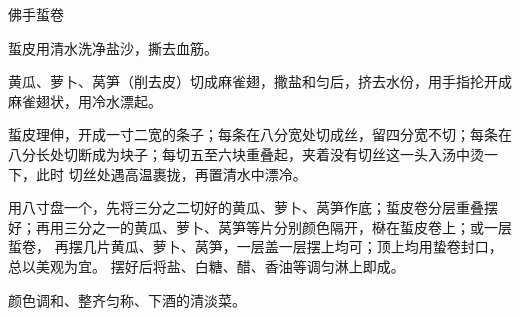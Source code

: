 \begin{recipe}{佛手蜇卷}

\ingredients


\preparation

\step 蜇皮用清水洗净盐沙，撕去血筋。

\step 黄瓜、萝卜、莴笋（削去皮）切成麻雀翅，撒盐和匀后，挤去水份，用手指抡开成
麻雀翅状，用冷水漂起。

\step 蜇皮理伸，开成一寸二宽的条子；每条在八分宽处切成丝，留四分宽不切；每条在
八分长处切断成为块子；每切五至六块重叠起，夹着没有切丝这一头入汤中烫一下，此时
切丝处遇高温裹拢，再置清水中漂冷。

\step 用八寸盘一个，先将三分之二切好的黄瓜、萝卜、莴笋作底；蜇皮卷分层重叠摆
好；再用三分之一的黄瓜、萝卜、莴笋等片分别颜色隔开，㮟在蜇皮卷上；或一层蜇卷，
再摆几片黄瓜、萝卜、莴笋，一层盖一层摆上均可；顶上均用蛰卷封口，总以美观为宜。
摆好后将盐、白糖、醋、香油等调匀淋上即成。

\features

颜色调和、整齐匀称、下酒的清淡菜。

\end{recipe}


